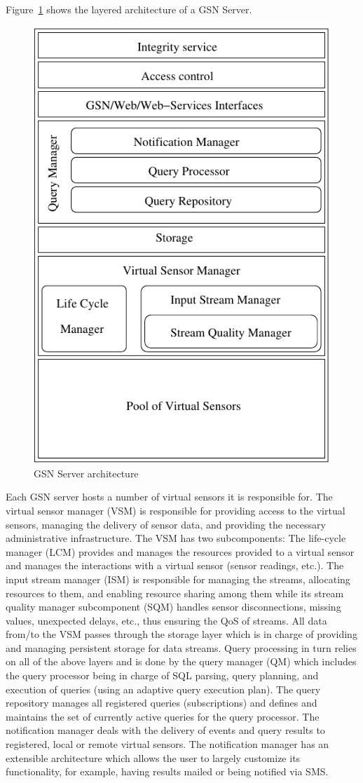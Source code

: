 Figure~\ref{fig:NodeArchitecture} shows the layered architecture of a
GSN Server.

\begin{figure}%
  \centering
  \includegraphics[width=0.45\columnwidth]{ch-gsn-figures/NodeArchitecture}
  \caption{GSN Server architecture}
  \label{fig:NodeArchitecture}
\end{figure}

Each GSN server hosts a number of virtual sensors it is responsible
for. The virtual sensor manager (VSM) is responsible for providing
access to the virtual sensors, managing the delivery of sensor data,
and providing the necessary administrative infrastructure. The VSM has
two subcomponents: The life-cycle manager (LCM) provides and manages
the resources provided to a virtual sensor and manages the
interactions with a virtual sensor (sensor readings, etc.). The input
stream manager (ISM) is responsible for managing the streams,
allocating resources to them, and enabling resource sharing among them
while its stream quality manager subcomponent (SQM) handles sensor
disconnections, missing values, unexpected delays, etc., thus ensuring
the QoS of streams. All data from/to the VSM passes through the
storage layer which is in charge of providing and managing persistent
storage for data streams. Query processing in turn relies on all of
the above layers and is done by the query manager (QM) which includes
the query processor being in charge of SQL parsing, query planning,
and execution of queries (using an adaptive query execution plan). The
query repository manages all registered queries (subscriptions) and
defines and maintains the set of currently active queries for the
query processor.  The notification manager deals with the delivery of
events and query results to registered, local or remote virtual sensors. The
notification manager has an extensible architecture which allows the
user to largely customize its functionality, for example, having
results mailed or being notified via SMS.

